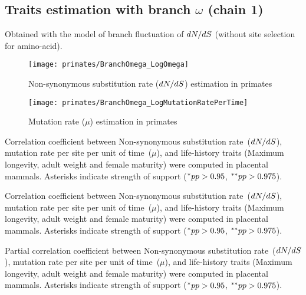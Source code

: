 \subsection{Traits estimation with branch \texorpdfstring{$\omega$}{ω} (chain 1)}
Obtained with the model of branch fluctuation of $\dnds$ (without site selection for amino-acid).

\begin{figure}[H]
    \centering
    \texttt{[image: primates/BranchOmega\_LogOmega]}
    \caption[$\dnds$ estimation in primates]{{Non-synonymous substitution} rate ($\dnds$) estimation in primates}
\end{figure}

\begin{figure}[H]
    \centering
    \texttt{[image: primates/BranchOmega\_LogMutationRatePerTime]}
    \caption[$\mu$ estimation in primates]{Mutation rate ($\mu$) estimation in primates}
\end{figure}

\begin{table}[H]
    
    \caption[Correlation coefficient matrix in primates ($\dnds$)]{
    Correlation coefficient between Non-synonymous \gls{substitution} rate~($\dnds$), mutation rate per site per unit of time~($\mu$), and life-history traits (Maximum longevity, adult weight and female maturity) were computed in placental mammals.
    Asterisks indicate strength of support ($\smash{^{*}} pp > 0.95$, $\smash{^{**}} pp > 0.975$).}
\end{table}

\begin{table}[H]
    
    \caption[Covariance matrix in primates ($\dnds$)]{
    Correlation coefficient between Non-synonymous \gls{substitution} rate~($\dnds$), mutation rate per site per unit of time~($\mu$), and life-history traits (Maximum longevity, adult weight and female maturity) were computed in placental mammals.
    Asterisks indicate strength of support ($\smash{^{*}} pp > 0.95$, $\smash{^{**}} pp > 0.975$).}
\end{table}

\begin{table}[H]
    
    \caption[Partial correlation coefficient matrix in primates ($\dnds$)]{
    Partial correlation coefficient between Non-synonymous \gls{substitution} rate~($\dnds$), mutation rate per site per unit of time~($\mu$), and life-history traits (Maximum longevity, adult weight and female maturity) were computed in placental mammals.
    Asterisks indicate strength of support ($\smash{^{*}} pp > 0.95$, $\smash{^{**}} pp > 0.975$).}
\end{table}


